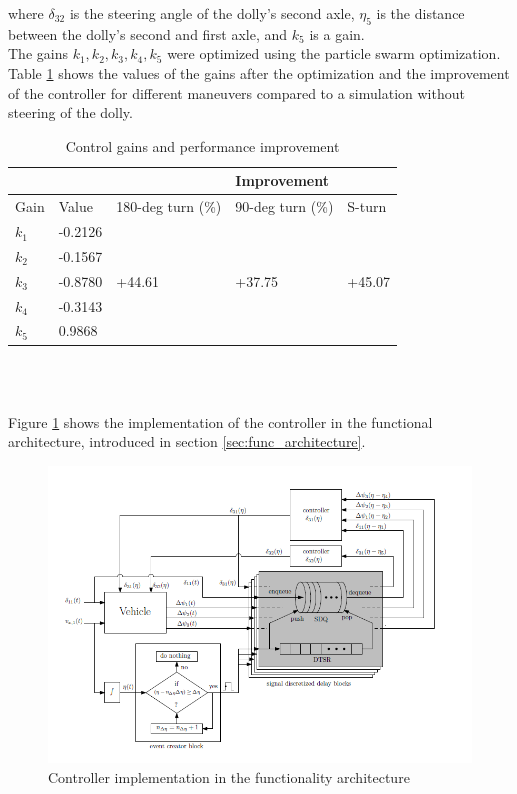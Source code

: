 \documentclass[ExampleMasters.tex]{subfiles}
\begin{document}
where $\delta_{32}$ is the steering angle of the dolly's second axle, $\eta_5$ is the distance between the dolly's second and first axle, and $k_5$ is a gain.\\
The gains $k_1, k_2, k_3, k_4, k_5$ were optimized using the particle swarm optimization.
Table \ref{tab:gains_after_optimization} shows the values of the gains after the optimization and the improvement of the controller for different maneuvers compared to a simulation without steering of the dolly.
\begin{table}[h]
	\centering
	\caption{Control gains and performance improvement}
	\label{tab:gains_after_optimization}
	\begin{tabular}{l|l|l l l}
		& &  & Improvement  \\ \hline
		Gain & Value & 180-deg turn (\%) & 90-deg turn (\%) & S-turn\\ \hline
		$k_1$   &       -0.2126      &             \\
		$k_2$    &            -0.1567 &             \\
		$k_3$  &      -0.8780       &           +44.61 & +37.75 & +45.07  \\
		$k_4$ &      -0.3143       &           \\
		$k_5$  & 0.9868 & \\
		
	\end{tabular} \\
\end{table}\\
Figure \ref{fig:low_speed_diagram} shows the implementation of the controller in the functional architecture, introduced in section \ref{sec:func_architecture}.

\begin{figure}[!htb]
	\centering
	\includegraphics[width=1.0\linewidth]{figures/Low_speed_diagram}
	\caption[Controller implementation in the functionality architecture]{Controller implementation in the functionality architecture \cite{Low-speed_paper}}
	\label{fig:low_speed_diagram}
\end{figure}
\end{document}
